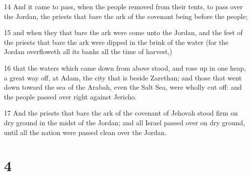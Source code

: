\par 14 And it came to pass, when the people removed from their tents, to pass over the Jordan, the priests that bare the ark of the covenant being before the people;
\par 15 and when they that bare the ark were come unto the Jordan, and the feet of the priests that bare the ark were dipped in the brink of the water (for the Jordan overfloweth all its banks all the time of harvest,)
\par 16 that the waters which came down from above stood, and rose up in one heap, a great way off, at Adam, the city that is beside Zarethan; and those that went down toward the sea of the Arabah, even the Salt Sea, were wholly cut off: and the people passed over right against Jericho.
\par 17 And the priests that bare the ark of the covenant of Jehovah stood firm on dry ground in the midst of the Jordan; and all Israel passed over on dry ground, until all the nation were passed clean over the Jordan.

\chapter{4}

